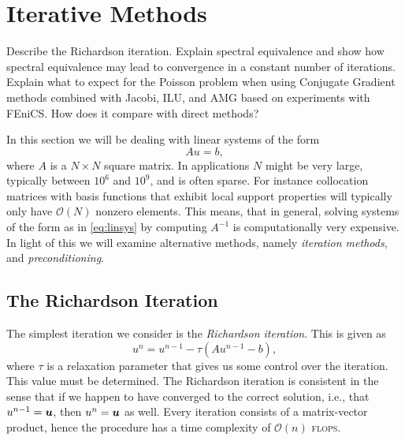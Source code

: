 \chapter[Iterative methods]{Iterative Methods}

\begin{problem_text}
Describe the Richardson iteration. Explain spectral equivalence and show
how spectral equivalence may lead to convergence in a constant number of
iterations. Explain what to expect for the Poisson problem when using
Conjugate Gradient methods combined with Jacobi, ILU, and AMG based on
experiments with FEniCS. How does it compare with direct methods?
\end{problem_text}

In this section we will be dealing with linear systems of the form
\begin{equation}
    \label{eq:linsys}
    A u = b, 
\end{equation}
where \(A\) is a \(N\times N\) square matrix. In applications \( N \) might be
very large, typically between \(10^6\) and \(10^9\), and is often sparse. For
instance collocation matrices with basis functions that exhibit local support
properties will typically only have \( \mathcal{O}(N) \) nonzero elements.
This means, that in general, solving systems of the form as in \cref{eq:linsys}
by computing \( A^{-1} \) is computationally very expensive. In light of this
we will examine alternative methods, namely \emph{iteration methods}, and
\emph{preconditioning}.

\section{The Richardson Iteration}
\label{sec:the_richardson_iteration}

The simplest iteration we consider is the \emph{Richardson iteration}. This is
given as
\begin{equation}
    \label{eq:iteration}
    u^{n} = u^{n-1} - \tau \left( A u^{n-1} - b \right),
\end{equation}
where \( \tau \) is a relaxation parameter that gives us some control over the
iteration. This value must be determined. The Richardson iteration is
consistent in the sense that if we happen to have converged to the correct
solution, i.e., that \( u^{n-1} = \boldsymbol{u} \), then \( u^n = \boldsymbol{u} \) as well.  Every
iteration consists of a matrix-vector product, hence the procedure has a time
complexity of \( \mathcal{O}(n) \) \textsc{flops}.

